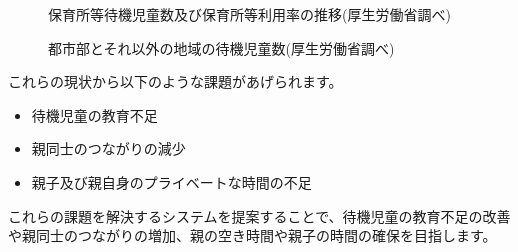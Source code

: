 \documentclass[a4j]{jarticle}
\begin{document}
\begin{figure}[H]
\begin{center}
\caption{保育所等待機児童数及び保育所等利用率の推移(厚生労働省調べ)}
\label{fig:2}
\end{center}
\end{figure}

\begin{figure}[H]
\begin{center}
\caption{都市部とそれ以外の地域の待機児童数(厚生労働省調べ)}
\label{fig:3}
\end{center}
\end{figure}

これらの現状から以下のような課題があげられます。

\begin{itemize}
\item 待機児童の教育不足
\item 親同士のつながりの減少
\item 親子及び親自身のプライベートな時間の不足
\end{itemize}

これらの課題を解決するシステムを提案することで、待機児童の教育不足の改善や親同士のつながりの増加、親の空き時間や親子の時間の確保を目指します。
\end{document}
